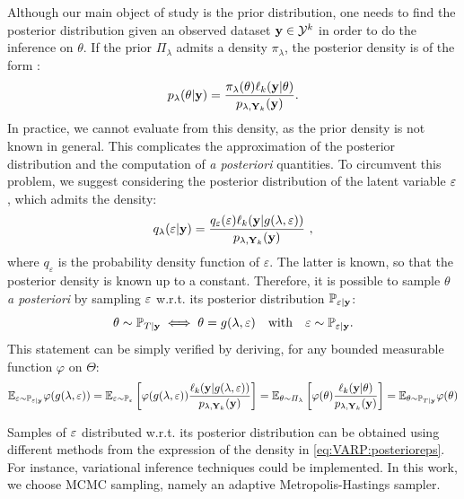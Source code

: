 Although our main object of study is the prior distribution, one needs to find the posterior distribution given an observed dataset $\mathbf{y}\in\mathcal{Y}^k$ in order to do the inference on $\theta$. If the prior $\varPi_\lambda$ admits a density $\pi_\lambda$, the posterior density is of the form : 
\begin{equation}
    p_{\lambda}(\theta |\mathbf{y}) = \frac{\pi_{\lambda}(\theta)\ell_k(\mathbf{y}| \theta)}{p_{\lambda,\mathbf{Y}_k}(\mathbf{y})} .
\end{equation}
In practice, we cannot evaluate from this density, as the prior density is not known in general. This complicates the approximation of the posterior distribution and the computation of  \emph{a posteriori} quantities.
To circumvent this problem, we suggest considering the posterior distribution of the latent variable $\varepsilon$, which admits the density:
\begin{equation}\label{eq:VARP:posterioreps}
    q_{\lambda}(\varepsilon |\mathbf{y}) = \frac{q_{\varepsilon}(\varepsilon)\ell_k(\mathbf{y} | g(\lambda, \varepsilon))}{p_{\lambda,\mathbf{Y}_k}(\mathbf{y})} \ ,    
\end{equation}
where $q_{\varepsilon}$ is the probability density function of $\varepsilon$. The latter is known, so that the posterior density is known up to a constant.
Therefore, it is possible to sample $\theta$ \emph{a posteriori} by sampling $\varepsilon$ w.r.t. its posterior distribution $\mathbb{P}_{\varepsilon|\mathbf{y}}$:
    \begin{equation}
        \theta\sim\mathbb{P}_{T|\mathbf{y}} \iff \theta=g(\lambda,\varepsilon)\quad \text{with}\quad \varepsilon\sim\mathbb{P}_{\varepsilon|\mathbf{y}}.
    \end{equation}
This statement can be simply verified by deriving, for any bounded measurable function $\varphi$ on $\Theta$:
    \begin{equation}
        \mathbb{E}_{\varepsilon\sim\mathbb{P}_{\varepsilon|\mathbf{y}}}\varphi(g(\lambda,\varepsilon)) = \mathbb{E}_{\varepsilon\sim\mathbb{P}_\varepsilon}\left[\varphi(g(\lambda,\varepsilon))\frac{\ell_k(\mathbf{y}|g(\lambda,\varepsilon))}{p_{\lambda,\mathbf{Y}_k}(\mathbf{y})} \right]
        = \mathbb{E}_{\theta\sim\varPi_\lambda}\left[\varphi(\theta)\frac{\ell_k(\mathbf{y}|\theta)}{p_{\lambda,\mathbf{Y}_k}(\mathbf{y})} \right] = \mathbb{E}_{\theta\sim\mathbb{P}_{T|\mathbf{y}}}\varphi(\theta)
    \end{equation}

Samples of $\varepsilon$ distributed w.r.t.  its posterior distribution can be obtained using different methods from the expression of the density in \cref{eq:VARP:posterioreps}.
For instance, variational inference techniques could be implemented. In this work, we choose MCMC sampling, namely an adaptive Metropolis-Hastings sampler.






